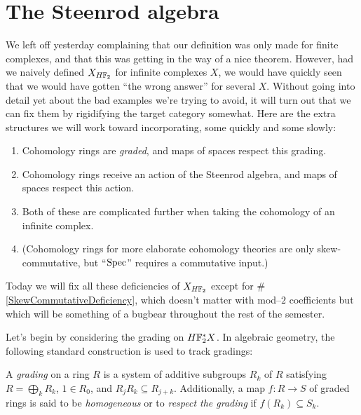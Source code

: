 \section{The Steenrod algebra}
\label{TheSteenrodAlgebraSection}


We left off yesterday complaining that our definition was only made for finite complexes, and that this was getting in the way of a nice theorem.    However, had we naively defined $X_{H\mathbb F_2}$ for infinite complexes $X$, we would have quickly seen that we would have gotten ``the wrong answer'' for several $X$.  Without going into detail yet about the bad examples we're trying to avoid, it will turn out that we can fix them by rigidifying the target category somewhat.  Here are the extra structures we will work toward incorporating, some quickly and some slowly:
\begin{enumerate}
\item Cohomology rings are \emph{graded}, and maps of spaces respect this grading.
\item Cohomology rings receive an action of the Steenrod algebra, and maps of spaces respect this action.
\item Both of these are complicated further when taking the cohomology of an infinite complex.
\item \label{SkewCommutativeDeficiency} (Cohomology rings for more elaborate cohomology theories are only skew-commutative, but ``$\operatorname{Spec}$'' requires a commutative input.)
\end{enumerate}
Today we will fix all these deficiencies of $X_{H\mathbb F_2}$ except for \#\ref{SkewCommutativeDeficiency}, which doesn't matter with mod--$2$ coefficients but which will be something of a bugbear throughout the rest of the semester.

Let's begin by considering the grading on $H\mathbb F_2^* X$.  In algebraic geometry, the following standard construction is used to track gradings:

\begin{definition}
A \textit{grading} on a ring $R$ is a system of additive subgroups $R_k$ of $R$ satisfying $R = \bigoplus_k R_k$, $1 \in R_0$, and $R_j R_k \subseteq R_{j+k}$.  Additionally, a map $f: R \to S$ of graded rings is said to be \textit{homogeneous} or to \textit{respect the grading} if $f(R_k) \subseteq S_k$.
\end{definition}

